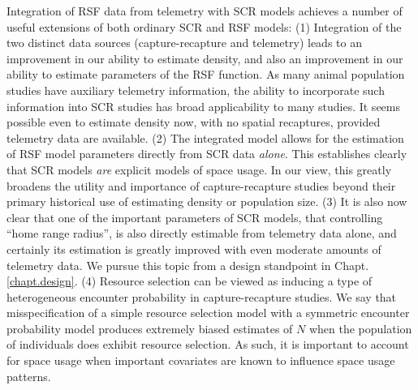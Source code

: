 Integration of RSF data from telemetry with SCR models achieves a
number of useful extensions of both ordinary SCR and RSF models:
(1) Integration of the two distinct data sources (capture-recapture
and telemetry)
leads to an improvement in our
ability to estimate density, and also an improvement in our ability to
estimate parameters of the RSF function.  
As many animal population studies have auxiliary
telemetry information, the ability to incorporate such information
into SCR studies has broad applicability to 
many studies.  
It seems possible even to estimate density now, with no
spatial recaptures, provided telemetry data are available.
(2) The integrated model allows for the estimation of 
 RSF model parameters directly from SCR data {\it alone}.
This 
establishes clearly that SCR models {\it are} explicit models of space
usage. In our view,  
this  greatly broadens the
utility and importance of capture-recapture studies beyond their
primary historical use of estimating density or population size.
(3) It is also now
clear that one of the important parameters of SCR models, that
controlling ``home range radius'', is also directly estimable from
telemetry data alone, and certainly its estimation is greatly improved
with even moderate amounts of telemetry data. We pursue this topic
from a design standpoint in Chapt. \ref{chapt.design}.
(4) Resource selection can be viewed as inducing a type of
heterogeneous encounter probability in capture-recapture studies.
We say 
\citep{royle_etal:2012mee} 
that misspecification of a simple resource selection model with a 
 symmetric encounter probability model produces
extremely biased estimates of $N$ when the population of individuals
does exhibit resource selection.  As such, it is important to account
for space usage when important covariates are known to influence
space usage patterns.





